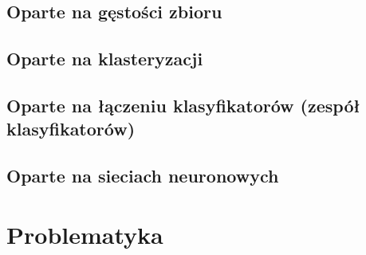     \subsection {Oparte na gęstości zbioru}
    \subsection {Oparte na klasteryzacji}
    \subsection {Oparte na łączeniu klasyfikatorów (zespół klasyfikatorów)}
    \subsection {Oparte na sieciach neuronowych}

\section{Problematyka}
